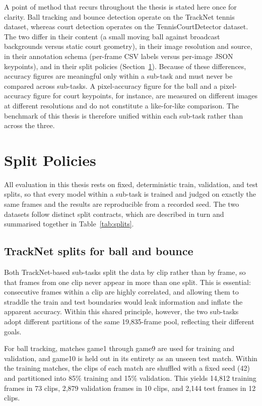 A point of method that recurs throughout the thesis is stated here once for
clarity. Ball tracking and bounce detection operate on the TrackNet tennis
dataset, whereas court detection operates on the TennisCourtDetector dataset.
The two differ in their content (a small moving ball against broadcast
backgrounds versus static court geometry), in their image resolution and source,
in their annotation schema (per-frame CSV labels versus per-image JSON
keypoints), and in their split policies (Section~\ref{sec:meth-splits}). Because
of these differences, accuracy figures are meaningful only within a
sub-task and must never be compared across sub-tasks. A pixel-accuracy
figure for the ball and a pixel-accuracy figure for court keypoints, for
instance, are measured on different images at different resolutions and do not
constitute a like-for-like comparison. The benchmark of this thesis is therefore
unified within each sub-task rather than across the three.

\section{Split Policies}
\label{sec:meth-splits}

All evaluation in this thesis rests on fixed, deterministic train, validation,
and test splits, so that every model within a sub-task is trained and judged on
exactly the same frames and the results are reproducible from a recorded seed.
The two datasets follow distinct split contracts, which are described in turn
and summarised together in Table~\ref{tab:splits}.

\subsection{TrackNet splits for ball and bounce}
\label{sec:meth-splits-tracknet}

Both TrackNet-based sub-tasks split the data by clip rather than by
frame, so that frames from one clip never appear in more than one split. This is
essential: consecutive frames within a clip are highly correlated, and allowing
them to straddle the train and test boundaries would leak information and inflate
the apparent accuracy. Within this shared principle, however, the two sub-tasks
adopt different partitions of the same 19{,}835-frame pool, reflecting their
different goals.

For ball tracking, matches game1 through game9 are used for
training and validation, and game10 is held out in its entirety as an
unseen test match. Within the training matches, the clips of each match are
shuffled with a fixed seed (42) and partitioned into 85\% training and 15\%
validation. This yields 14{,}812 training frames in 73 clips, 2{,}879
validation frames in 10 clips, and 2{,}144 test frames in 12 clips.

